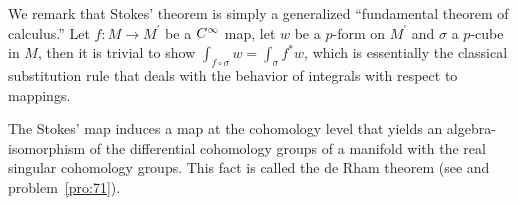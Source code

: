 \documentclass[../main]{subfiles}
\begin{document}
We remark that Stokes' theorem is simply a generalized ``fundamental theorem of calculus.'' Let $f: M \rightarrow M^{\prime}$ be a $C^\infty$ map, let $w$ be a $p$-form on $M^{\prime}$ and $\sigma$ a $p$-cube in $M$, then it is trivial to show $\int_{f \circ \sigma} w=\int_{\sigma} f^\ast w$, which is essentially the classical substitution rule that deals with the behavior of integrals with respect to mappings.

The Stokes' map induces a map at the cohomology level that yields an algebra-isomorphism of the differential cohomology groups of a manifold with the real singular cohomology groups. This fact is called the de Rham theorem (see \cite{Weil1952} and problem~\ref{pro:71}).
\end{document}
